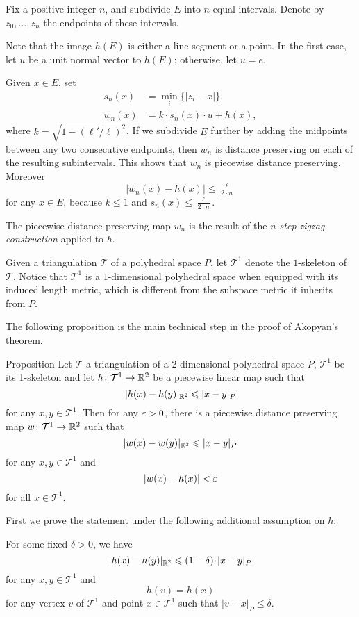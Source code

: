 Fix a positive integer $n$, and subdivide $E$ into $n$ equal intervals.
Denote by $z_0,\dots,z_n$ the endpoints of these intervals.

Note that the image $h(E)$ is either a line segment or a point.
In the first case, let $u$ be a unit normal vector to $h(E)$;
otherwise, let $u=e$.  

Given $x\in E$, 
set 
\begin{align*}
s_n(x)&=\min_i\{|z_i-x|\},
\\
w_n(x)&=k\cdot s_n(x)\cdot u+h(x),
\end{align*}
where
$k=\sqrt{1-(\ell'/\ell)^2}$. 
If we subdivide $E$ further by adding the midpoints between any two consecutive endpoints, then $w_n$ is distance preserving on each of the resulting subintervals.  This shows that $w_n$ is piecewise distance preserving.
Moreover
$$|w_n(x)-h(x)|\le\tfrac{\ell}{2\cdot n}$$
for any $x\in E$, because $k \le 1$ and $s_n(x) \le \tfrac{\ell}{2\cdot n}$.

The piecewise distance preserving map $w_n$ is the result of the \emph{$n$-step zigzag construction} applied to $h$.

\medskip

Given a triangulation $\mathcal{T}$ of a polyhedral space $P$, let $\mathcal{T}^1$ denote the $1$-skeleton of $\mathcal{T}$.
Notice that $\mathcal{T}^1$ is a $1$-dimensional polyhedral space when equipped with its induced length metric, which is different from the subspace metric it inherits from $P$.

The following proposition is the main technical step in the proof of Akopyan's theorem.


\begin{thm}{Proposition}\label{clm:main-step} 
Let $\mathcal{T}$ a triangulation of a $2$-dimensional polyhedral space $P$, $\mathcal{T}^1$ be its 1-skeleton
and let $h\colon\mathcal{T}^1\to \mathbb{R}^2$
be a piecewise linear map
such that 
$$|h(x)-h(y)|_{\mathbb{R}^2}\leqslant |x-y|_P$$
for any $x,y\in \mathcal{T}^1$.
Then for any $\varepsilon > 0$, there is a piecewise distance preserving map $w\colon\mathcal{T}^1\to \mathbb{R}^2$ such that
$$|w(x)-w(y)|_{\mathbb{R}^2}\leqslant |x-y|_P$$ for any $x,y \in \mathcal{T}^1$ and
$$|w(x) - h(x)| < \varepsilon$$ for all $x \in \mathcal{T}^1$.
\end{thm}

First we prove the statement under the following additional assumption on $h$:

\begin{clm}{}\label{clm:delta-condition}
For some fixed $\delta>0$, we have
\[|h(x)-h(y)|_{\RR^2}\le(1-\delta)\cdot|x-y|_P\]
for any $x,y\in \mathcal{T}^1$
and 
$$h(v)=h(x)$$ 
for any vertex $v$ of $\mathcal{T}^1$
and point $x\in\mathcal{T}^1$ such that  $|v-x|_P\le\delta$.
\end{clm}


